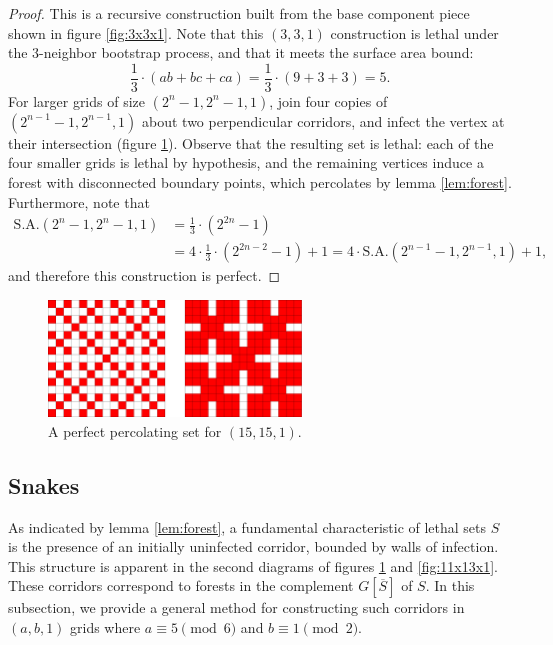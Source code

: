 \begin{proof}
This is a recursive construction built from the base component piece shown in figure \ref{fig:3x3x1}. Note that this $(3,3,1)$ construction is lethal under the 3-neighbor bootstrap process, and that it meets the surface area bound:
$$\frac{1}{3} \cdot (ab+bc+ca) = \frac{1}{3} \cdot (9 + 3 + 3) = 5.$$
For larger grids of size $(2^n-1, 2^n-1, 1)$, join four copies of $(2^{n-1}-1, 2^{n-1}, 1)$ about two perpendicular corridors, and infect the vertex at their intersection (figure \ref{fig:15x15x1}). Observe that the resulting set is lethal: each of the four smaller grids is lethal by hypothesis, and the remaining vertices induce a forest with disconnected boundary points, which percolates by lemma \ref{lem:forest}. Furthermore, note that
\begin{align*}
\text{S.A.}(2^n-1,2^n-1,1) &= \frac{1}{3} \cdot (2^{2n}-1) \\
&= 4 \cdot \frac{1}{3} \cdot (2^{2n-2} -1) + 1 = 4 \cdot \text{S.A.}(2^{n-1}-1, 2^{n-1}, 1) + 1,
\end{align*}
and therefore this construction is perfect.
\end{proof}

\begin{figure}[]
\centering
\includegraphics[width=0.6\textwidth]{figures/7/15x15x1.pdf}
\caption{A perfect percolating set for $(15,15,1)$.}
\label{fig:15x15x1}
\end{figure} 

\subsection{Snakes}

As indicated by lemma \ref{lem:forest}, a fundamental characteristic of lethal sets $S$ is the presence of an initially uninfected corridor, bounded by walls of infection. This structure is apparent in the second diagrams of figures \ref{fig:15x15x1} and \ref{fig:11x13x1}. These corridors correspond to forests in the complement $G[\overline{S}]$ of $S$. In this subsection, we provide a general method for constructing such corridors in $(a, b, 1)$ grids where $a \equiv 5 \pmod 6$ and $b \equiv 1 \pmod 2$.


